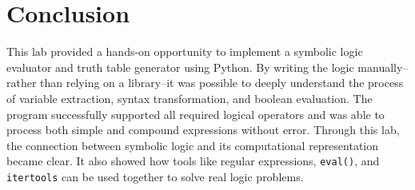 \documentclass[a4paper, journal]{IEEEtran}
\begin{document}
\section{Conclusion}
This lab provided a hands-on opportunity to implement a symbolic logic evaluator and truth table generator using Python. By writing the logic manually--rather than relying on a library--it was possible to deeply understand the process of variable extraction, syntax transformation, and boolean evaluation. The program successfully supported all required logical operators and was able to process both simple and compound expressions without error. Through this lab, the connection between symbolic logic and its computational representation became clear. It also showed how tools like regular expressions, \texttt{eval()}, and \texttt{itertools} can be used together to solve real logic problems. 
\end{document}
